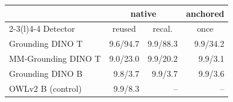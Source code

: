 \setlength{\tabcolsep}{4pt}\begin{tabular}{@{}lrrr@{}}
\toprule
& \multicolumn{2}{c}{native} & \multicolumn{1}{c}{anchored} \\ \cmidrule(lr){2-3}\cmidrule(l){4-4}
Detector & \multicolumn{1}{c}{reused} & \multicolumn{1}{c}{recal.} & \multicolumn{1}{c}{once} \\
\midrule
Grounding DINO T & 9.6/94.7 & 9.9/88.3 & 9.9/34.2 \\
MM-Grounding DINO T & 9.0/23.0 & 9.9/20.2 & 9.9/3.1 \\
Grounding DINO B & 9.8/3.7 & 9.9/3.7 & 9.9/3.6 \\
OWLv2 B (control) & 9.9/8.3 & -- & -- \\
\bottomrule
\end{tabular}
